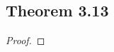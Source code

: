 \documentclass[../../main.tex]{subfiles}
\begin{document}
\subsection{Theorem 3.13}
\begin{wts}

\end{wts}
\begin{proof}

\end{proof}
\end{document}
